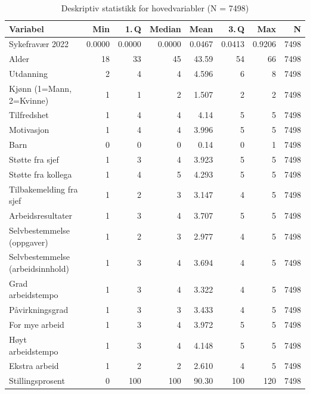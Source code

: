 \documentclass[
  12pt,
  a4paper,
  DIV=11,
  numbers=noendperiod]{scrartcl}
\begin{document}
\begin{table}[ht]
\centering
\begin{tabular}{lrrrrrrr}
\toprule
Variabel                               & Min   & 1.\,Q  & Median & Mean   & 3.\,Q  & Max  & N    \\
\midrule
Sykefravær 2022                        & 0.0000 & 0.0000 & 0.0000 & 0.0467 & 0.0413 & 0.9206 & 7498 \\
Alder                                  & 18     & 33     & 45     & 43.59  & 54     & 66     & 7498 \\
Utdanning                              & 2      & 4      & 4      & 4.596  & 6      & 8      & 7498 \\
Kjønn (1=Mann, 2=Kvinne)               & 1      & 1      & 2      & 1.507  & 2      & 2      & 7498 \\
Tilfredshet                            & 1      & 4      & 4      & 4.14   & 5      & 5      & 7498 \\
Motivasjon                             & 1      & 4      & 4      & 3.996  & 5      & 5      & 7498 \\
Barn                                   & 0      & 0      & 0      & 0.14   & 0      & 1      & 7498 \\
Støtte fra sjef                        & 1      & 3      & 4      & 3.923  & 5      & 5      & 7498 \\
Støtte fra kollega                     & 1      & 4      & 5      & 4.293  & 5      & 5      & 7498 \\
Tilbakemelding fra sjef                & 1      & 2      & 3      & 3.147  & 4      & 5      & 7498 \\
Arbeidsresultater                      & 1      & 3      & 4      & 3.707  & 5      & 5      & 7498 \\
Selvbestemmelse (oppgaver)             & 1      & 2      & 3      & 2.977  & 4      & 5      & 7498 \\
Selvbestemmelse (arbeidsinnhold)       & 1      & 3      & 4      & 3.694  & 4      & 5      & 7498 \\
Grad arbeidstempo                      & 1      & 3      & 4      & 3.322  & 4      & 5      & 7498 \\
Påvirkningsgrad                        & 1      & 3      & 3      & 3.433  & 4      & 5      & 7498 \\
For mye arbeid                         & 1      & 3      & 4      & 3.972  & 5      & 5      & 7498 \\
Høyt arbeidstempo                      & 1      & 3      & 4      & 4.148  & 5      & 5      & 7498 \\
Ekstra arbeid                          & 1      & 2      & 2      & 2.610  & 4      & 5      & 7498 \\
Stillingsprosent                       & 0      & 100    & 100    & 90.30  & 100    & 120    & 7498 \\
\bottomrule
\end{tabular}
\caption{Deskriptiv statistikk for hovedvariabler (N = 7498)}
\label{tab:deskriptiv}
\end{table}
\end{document}
